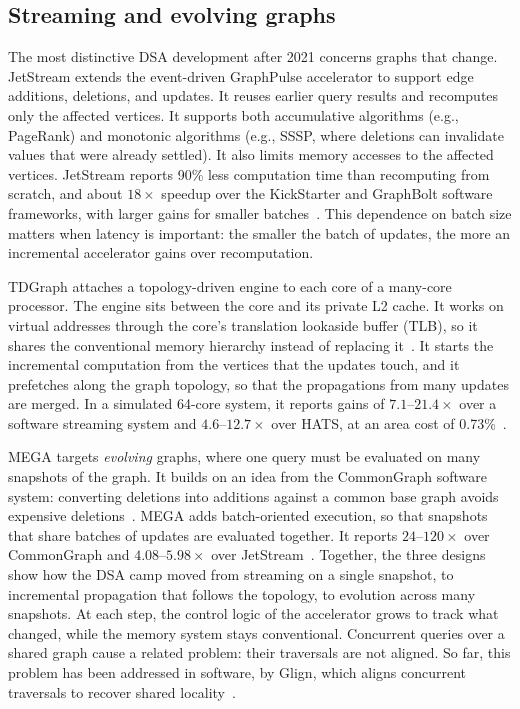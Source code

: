 \documentclass[journal,onecolumn]{IEEEtran}
\begin{document}
\subsection{Streaming and evolving graphs}
The most distinctive DSA development after 2021 concerns graphs that change. JetStream extends the event-driven GraphPulse accelerator to support edge additions, deletions, and updates. It reuses earlier query results and recomputes only the affected vertices. It supports both accumulative algorithms (e.g., PageRank) and monotonic algorithms (e.g., SSSP, where deletions can invalidate values that were already settled). It also limits memory accesses to the affected vertices. JetStream reports 90\% less computation time than recomputing from scratch, and about $18\times$ speedup over the KickStarter and GraphBolt software frameworks, with larger gains for smaller batches~\cite{rahman2021jetstream}. This dependence on batch size matters when latency is important: the smaller the batch of updates, the more an incremental accelerator gains over recomputation.

TDGraph attaches a topology-driven engine to each core of a many-core processor. The engine sits between the core and its private L2 cache. It works on virtual addresses through the core's translation lookaside buffer (TLB), so it shares the conventional memory hierarchy instead of replacing it~\cite{zhao2022tdgraph}. It starts the incremental computation from the vertices that the updates touch, and it prefetches along the graph topology, so that the propagations from many updates are merged. In a simulated 64-core system, it reports gains of $7.1$--$21.4\times$ over a software streaming system and $4.6$--$12.7\times$ over HATS, at an area cost of 0.73\%~\cite{zhao2022tdgraph}.

MEGA targets \emph{evolving} graphs, where one query must be evaluated on many snapshots of the graph. It builds on an idea from the CommonGraph software system: converting deletions into additions against a common base graph avoids expensive deletions~\cite{afarin2023commongraph}. MEGA adds batch-oriented execution, so that snapshots that share batches of updates are evaluated together. It reports $24$--$120\times$ over CommonGraph and $4.08$--$5.98\times$ over JetStream~\cite{gao2023mega}. Together, the three designs show how the DSA camp moved from streaming on a single snapshot, to incremental propagation that follows the topology, to evolution across many snapshots. At each step, the control logic of the accelerator grows to track what changed, while the memory system stays conventional. Concurrent queries over a shared graph cause a related problem: their traversals are not aligned. So far, this problem has been addressed in software, by Glign, which aligns concurrent traversals to recover shared locality~\cite{yin2023glign}.
\end{document}
